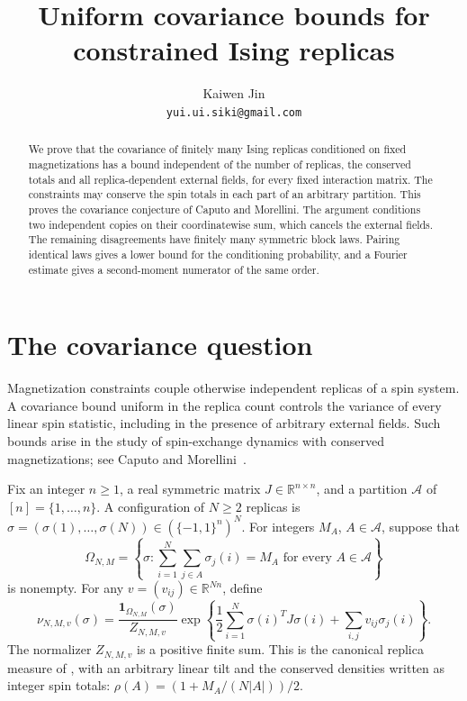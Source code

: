 \documentclass[11pt]{article}
\title{Uniform covariance bounds for constrained Ising replicas}
\author{Kaiwen Jin\\\small\texttt{yui.ui.siki@gmail.com}}
\date{}
\begin{document}
\maketitle
\begin{abstract}
We prove that the covariance of finitely many Ising replicas conditioned on
fixed magnetizations has a bound independent of the number of replicas,
the conserved totals and all replica-dependent external fields, for every
fixed interaction matrix. The constraints may conserve the spin totals in
each part of an arbitrary partition. This proves the covariance conjecture
of Caputo and Morellini. The argument conditions two independent copies on
their coordinatewise sum, which cancels the external fields. The remaining
disagreements have finitely many symmetric block laws. Pairing identical
laws gives a lower bound for the conditioning probability, and a Fourier
estimate gives a second-moment numerator of the same order.
\end{abstract}

\section{The covariance question}
Magnetization constraints couple otherwise independent replicas of a spin
system. A covariance bound uniform in the replica count controls the variance
of every linear spin statistic, including in the presence of arbitrary
external fields. Such bounds arise in the study of spin-exchange dynamics
with conserved magnetizations; see Caputo and Morellini~\cite[Sections 1.5
and 4.5]{CM}.

Fix an integer $n\geq1$, a real symmetric matrix $J\in\mathbb R^{n\times n}$,
and a partition $\mathcal A$ of $[n]=\{1,\ldots,n\}$. A configuration of
$N\geq2$ replicas is
$\sigma=(\sigma(1),\ldots,\sigma(N))\in(\{-1,1\}^n)^N$.
For integers $M_A$, $A\in\mathcal A$, suppose that
\[
 \Omega_{N,M}=\left\{\sigma:
  \sum_{i=1}^N\sum_{j\in A}\sigma_j(i)=M_A
  \text{ for every } A\in\mathcal A\right\}
\]
is nonempty. For any $v=(v_{ij})\in\mathbb R^{Nn}$, define
\begin{equation}\label{eq:law}
 \nu_{N,M,v}(\sigma)=\frac{\mathbf1_{\Omega_{N,M}}(\sigma)}{Z_{N,M,v}}
 \exp\left\{\frac12\sum_{i=1}^N\sigma(i)^TJ\sigma(i)
                  +\sum_{i,j}v_{ij}\sigma_j(i)\right\}.
\end{equation}
The normalizer $Z_{N,M,v}$ is a positive finite sum.
This is the canonical replica measure of
\cite[Definition~1.9, eqs.\ (1.23)--(1.24)]{CM}, with an arbitrary linear
tilt and the conserved densities written as integer spin totals: $\rho(A)=(1+M_A/(N|A|))/2$.
\end{document}
